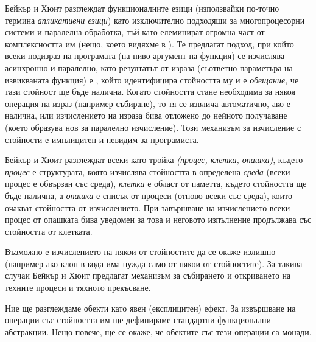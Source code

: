 Бейкър и Хюит разглеждат функционалните езици (използвайки по-точно термина \emph{апликативни езици}) като изключително подходящи за многопроцесорни системи и паралелна обработка, тъй като елеминират огромна част от комплексността им (нещо, което видяхме в ). Те предлагат подход, при който всеки подизраз на програмата (на ниво аргумент на функция) се изчислява асинхронно и паралелно, като резултатът от израза (съответно параметъра на извикваната функция) е , който идентифицира стойността му и е \emph{обещание}, че тази стойност ще бъде налична. Когато стойността стане необходима за някоя операция на израз (например събиране), то тя се извлича автоматично, ако е налична, или изчислението на израза бива отложено до нейното получаване (което образува нов  за паралелно изчисление). Този механизъм за изчисление с  стойности е имплицитен и невидим за програмиста.

Бейкър и Хюит разглеждат всеки  като тройка \emph{(процес, клетка, опашка)}, където \emph{процес} е структурата, която изчислява стойността в определена \emph{среда} (всеки процес е обвързан със среда), \emph{клетка} е област от паметта, където стойността ще бъде налична, а \emph{опашка} е списък от процеси (отново всеки със среда), които очакват стойността от изчислението. При завършване на изчислението всеки процес от опашката бива уведомен за това и неговото изпълнение продължава със стойността от клетката.

Възможно е изчислението на някои от  стойностите да се окаже излишно (например ако  клон в кода има нужда само от някои от стойностите). За такива случаи Бейкър и Хюит предлагат механизъм за събирането и откриването на техните процеси и тяхното прекъсване.

Ние ще разглеждаме  обекти като явен (експлицитен) ефект. За извършване на операции със стойността им ще дефинираме стандартни функционални абстракции. Нещо повече, ще се окаже, че  обектите със тези операции са монади.


